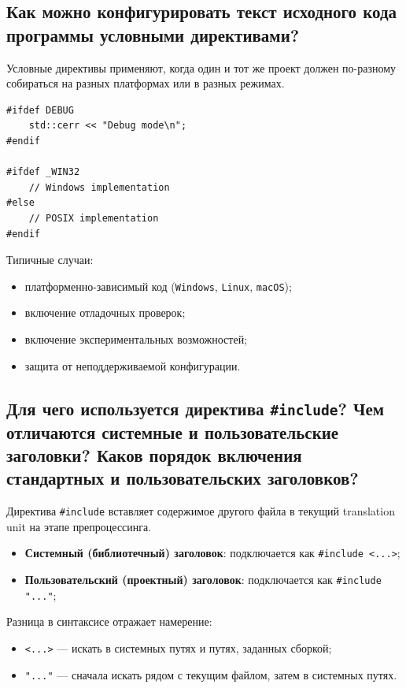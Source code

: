 \subsection{Как можно конфигурировать текст исходного кода программы условными директивами?}
Условные директивы применяют, когда один и тот же проект должен по-разному собираться на разных платформах или в разных режимах.

\begin{example}
\begin{verbatim}
#ifdef DEBUG
    std::cerr << "Debug mode\n";
#endif

#ifdef _WIN32
    // Windows implementation
#else
    // POSIX implementation
#endif
\end{verbatim}
\end{example}

Типичные случаи:
\begin{itemize}
    \item платформенно-зависимый код (\texttt{Windows}, \texttt{Linux}, \texttt{macOS});
    \item включение отладочных проверок;
    \item включение экспериментальных возможностей;
    \item защита от неподдерживаемой конфигурации.
\end{itemize}

\subsection{Для чего используется директива \texttt{\#include}? Чем отличаются системные и пользовательские заголовки? Каков порядок включения стандартных и пользовательских заголовков?}
Директива \texttt{\#include} вставляет содержимое другого файла в текущий translation unit на этапе препроцессинга.

\begin{definition}
\begin{itemize}
    \item \textbf{Системный (библиотечный) заголовок}: подключается как \texttt{\#include <...>};
    \item \textbf{Пользовательский (проектный) заголовок}: подключается как \texttt{\#include "..."};
\end{itemize}
\end{definition}

Разница в синтаксисе отражает намерение:
\begin{itemize}
    \item \texttt{<...>} — искать в системных путях и путях, заданных сборкой;
    \item \texttt{"..."} — сначала искать рядом с текущим файлом, затем в системных путях.
\end{itemize}

